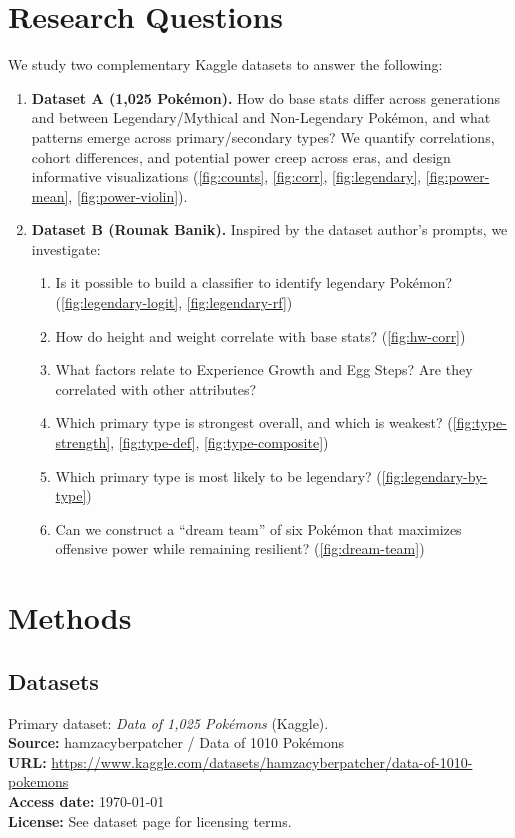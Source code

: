 \documentclass[11pt]{article}
\begin{document}
\section*{Research Questions}
We study two complementary Kaggle datasets to answer the following:
\begin{enumerate}[leftmargin=*]
  \item \textbf{Dataset A (1,025 Pokémon).} How do base stats differ across generations and between Legendary/Mythical and Non-Legendary Pokémon, and what patterns emerge across primary/secondary types? We quantify correlations, cohort differences, and potential power creep across eras, and design informative visualizations (\autoref{fig:counts}, \autoref{fig:corr}, \autoref{fig:legendary}, \autoref{fig:power-mean}, \autoref{fig:power-violin}).
  \item \textbf{Dataset B (Rounak Banik).} Inspired by the dataset author's prompts, we investigate:
  \begin{enumerate}[label=\alph*)]
    \item Is it possible to build a classifier to identify legendary Pokémon? (\autoref{fig:legendary-logit}, \autoref{fig:legendary-rf})
    \item How do height and weight correlate with base stats? (\autoref{fig:hw-corr})
    \item What factors relate to Experience Growth and Egg Steps? Are they correlated with other attributes?
    \item Which primary type is strongest overall, and which is weakest? (\autoref{fig:type-strength}, \autoref{fig:type-def}, \autoref{fig:type-composite})
    \item Which primary type is most likely to be legendary? (\autoref{fig:legendary-by-type})
    \item Can we construct a ``dream team'' of six Pokémon that maximizes offensive power while remaining resilient? (\autoref{fig:dream-team})
  \end{enumerate}
\end{enumerate}

\section*{Methods}
\subsection*{Datasets}
Primary dataset: \emph{Data of 1,025 Pokémons} (Kaggle).\\
\textbf{Source:} hamzacyberpatcher / Data of 1010 Pokémons\\
\textbf{URL:} \url{https://www.kaggle.com/datasets/hamzacyberpatcher/data-of-1010-pokemons}\\
\textbf{Access date:} \today\\
\textbf{License:} See dataset page for licensing terms.
\end{document}
